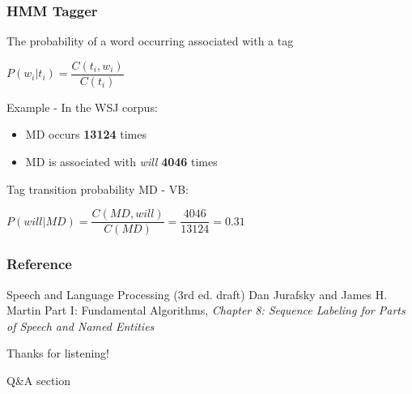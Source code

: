 \documentclass[13.5pt,aspecratio=169]{beamer}
\begin{document}
\begin{frame}
    \onehalfspacing
        \frametitle{HMM Tagger}
        {\Large The probability of a word occurring associated with a tag
        \begin{center}
            $P(w_i | t_i) = \dfrac{C(t_i, w_i)}{C(t_i)}$
        \end{center}}
    
        {
            \begin{block}{Example - In the WSJ corpus:}
                \begin{itemize}
                    \item MD occurs \textbf{13124} times
                    \item MD is associated
                    with \textit{will} \textbf{4046} times
                \end{itemize}
                Tag transition probability MD - VB:
                \begin{center}
                    $ P(will | MD) = \dfrac{C(MD, will)}{C(MD)} = \dfrac{4046}{13124} = 0.31 $
                \end{center}
            \end{block}
        }
    \end{frame}



\onehalfspacing
\begin{frame} %
	\frametitle{Reference}
	
	\begin{thebibliography}{99} %
		\footnotesize %
		
			Speech and Language Processing (3rd ed. draft)
			\newblock Dan Jurafsky and James H. Martin
			\newblock Part I: Fundamental Algorithms, \emph{Chapter 8: Sequence Labeling for Parts of
            Speech and Named Entities}
			
	\end{thebibliography}
\end{frame}




\begin{frame} %
	\begin{center}
		{\Huge Thanks for listening!}
		
		\bigskip\bigskip %
		
		{\LARGE Q\&A section}
	\end{center}
\end{frame}
\end{document}
